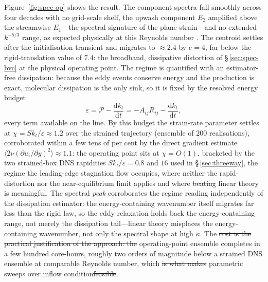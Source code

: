 \documentclass[lineno]{JFM-FLM_Au}
\providecommand{\DIFadd}[1]{{\protect\color{blue}\uwave{#1}}} %
\providecommand{\DIFdel}[1]{{\protect\color{red}\sout{#1}}} %
\providecommand{\DIFaddbegin}{} %
\providecommand{\DIFaddend}{} %
\providecommand{\DIFdelbegin}{} %
\providecommand{\DIFdelend}{} %
\begin{document}
Figure~\ref{fig:spec-op} shows the result. The component spectra fall
smoothly across four decades with no grid-scale shelf, the upwash
component $E_2$ amplified above the streamwise $E_1$---the spectral
signature of the plane strain---and no extended $k^{-5/3}$ range, as
expected physically at this Reynolds number
\citep{Kolmogorov1991,Pope2000}. The centroid settles after the
initialisation transient and migrates to $\approx2.4$ by $e=4$, far
below the rigid-translation value of $7.4$: the broadband, dissipative
distortion of \S\,\ref{sec:spec-bvc} at the physical operating point. The regime is
quantified with an estimator-free dissipation: because the eddy events
conserve energy and the production is exact, molecular dissipation is
the only sink, so it is fixed by the resolved energy budget
\begin{equation}
  \varepsilon = \mathcal{P} - \frac{\mathrm{d}k_t}{\mathrm{d}t}
              = -A_{ij}R_{ij} - \frac{\mathrm{d}k_t}{\mathrm{d}t},
  \label{eq:eps-budget}
\end{equation}
every term available on the line. By this budget the strain-rate
parameter settles at $\chi=Sk_t/\varepsilon\approx1.2$ over the strained
trajectory (ensemble of $200$ realisations), corroborated within a few
tens of per cent by the direct gradient estimate
$\langle2\nu(\partial u_i/\partial y)^2\rangle\approx1.1$: the
operating point sits at $\chi=O(1)$, bracketed by the two strained-box
DNS rapidities $Sk_t/\varepsilon=0.8$ and $16$ used in
\S\,\ref{sec:threeway}, the regime the leading-edge
stagnation flow occupies, where neither the rapid-distortion nor the
near-equilibrium limit applies and where \DIFdelbegin \DIFdel{beating }\DIFdelend \DIFaddbegin \DIFadd{improvement over }\DIFaddend linear theory is
meaningful. The spectral \emph{peak} corroborates the regime reading
independently of the dissipation estimator: the energy-containing
wavenumber itself migrates far less than the rigid law, so the eddy
relaxation holds back the energy-containing range, not merely the
dissipation tail---linear theory misplaces the energy-containing
wavenumber, not only the spectral shape at high $\kappa$. 
The \DIFdelbegin \DIFdel{cost is
the practical justification of the approach: the }\DIFdelend operating-point
ensemble completes in a few hundred core-hours, roughly two orders of
magnitude below a strained DNS ensemble at comparable Reynolds number,
which \DIFdelbegin \DIFdel{is what makes }\DIFdelend \DIFaddbegin \DIFadd{permits }\DIFaddend parametric sweeps over inflow condition\DIFdelbegin \DIFdel{feasible}\DIFdelend .
\end{document}

